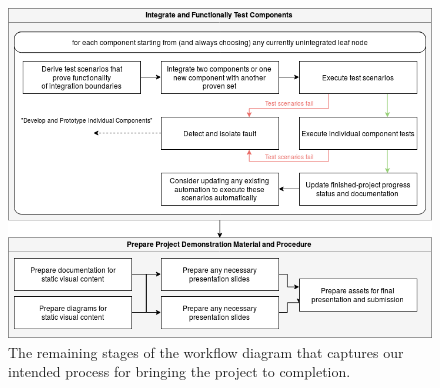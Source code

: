 \documentclass{article}
\begin{document}
\begin{figure}[H]
	\centering
	\includegraphics[width=\linewidth]{../src/im/workflow_2}
	\caption{The remaining stages of the workflow diagram that captures our
		intended process for bringing the project to completion.}
	\label{fig:workflow_2}
\end{figure}
\end{document}
